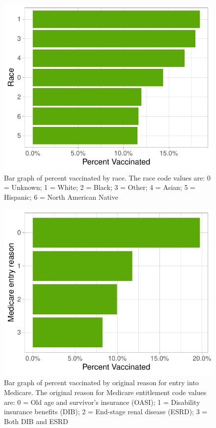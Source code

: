 \documentclass[
  12pt,
]{article}
\begin{document}
\begin{figure}[H]

{\centering \includegraphics{report_files/figure-latex/unnamed-chunk-4-1} 

}

\caption{Bar graph of percent vaccinated by race. The race code values are: 0 = Unknown; 1 = White; 2 = Black; 3 = Other; 4 = Asian; 5 = Hispanic; 6 = North American Native}\label{fig:unnamed-chunk-4}
\end{figure}

\begin{figure}[H]

{\centering \includegraphics{report_files/figure-latex/unnamed-chunk-5-1} 

}

\caption{Bar graph of percent vaccinated by original reason for entry into Medicare. The original reason for Medicare entitlement code values are: 0    = Old age and survivor’s insurance (OASI); 1 = Disability insurance benefits (DIB); 2 = End-stage renal disease (ESRD); 3   = Both DIB and ESRD}\label{fig:unnamed-chunk-5}
\end{figure}
\end{document}
